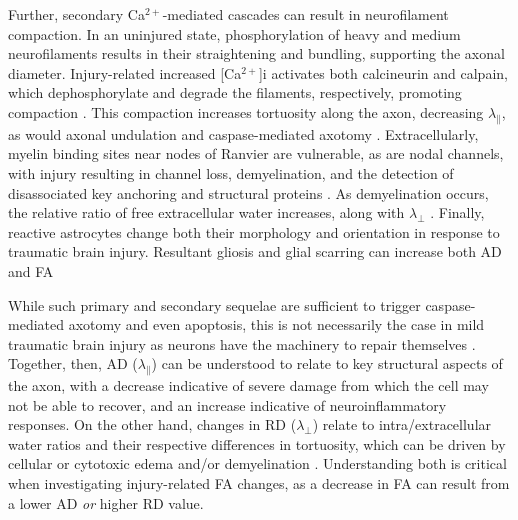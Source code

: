 \documentclass[12pt]{article}
\begin{document}
Further, secondary Ca$^{2+}$-mediated cascades can result in neurofilament compaction. In an uninjured state, phosphorylation of heavy and medium neurofilaments results in their straightening and bundling, supporting the axonal diameter. Injury-related increased [Ca$^{2+}$]i activates both calcineurin and calpain, which dephosphorylate and degrade the filaments, respectively, promoting compaction \parencite{krieg2023IdentifyingPhenotypesDiffuse,pant1988DephosphorylationNeurofilamentProteins,chen1999EvolutionNeurofilamentSubtype}. This compaction increases tortuosity along the axon, decreasing $\lambda_\parallel$, as would axonal undulation and caspase-mediated axotomy \parencite{svandova2023MakingHeadCaspases}. Extracellularly, myelin binding sites near nodes of Ranvier are vulnerable, as are nodal channels, with injury resulting in channel loss, demyelination, and the detection of disassociated key anchoring and structural proteins \parencite{song2022ConcussionLeadsWidespread,zhu2016NodalTotalAxonal,krieg2023IdentifyingPhenotypesDiffuse}. As demyelination occurs, the relative ratio of free extracellular water increases, along with $\lambda_\perp$ \parencite{mayer2010ProspectiveDiffusionTensor,winklewski2018UnderstandingPhysiopathologyAxial}. Finally, reactive astrocytes change both their morphology and orientation in response to traumatic brain injury. Resultant gliosis and glial scarring can increase both AD and FA \parencite{budde2011ContributionGliosisDiffusion,churchill2017WhiteMatterMicrostructure,cieri2025AstrocytesReactiveAstrogliosis,mira2021TraumaticBrainInjury,sofroniew2009MolecularDissectionReactive}

While such primary and secondary sequelae are sufficient to trigger caspase-mediated axotomy and even apoptosis, this is not necessarily the case in mild traumatic brain injury as neurons have the machinery to repair themselves \parencite{franze2013MechanicsNeuronalDevelopment,sakai2019InflammationNeuralRepair}. Together, then, AD ($\lambda_\parallel$) can be understood to relate to key structural aspects of the axon, with a decrease indicative of severe damage from which the cell may not be able to recover, and an increase indicative of neuroinflammatory responses. On the other hand, changes in RD ($\lambda_\perp$) relate to intra/extracellular water ratios and their respective differences in tortuosity, which can be driven by cellular or cytotoxic edema and/or demyelination \parencite{borja2018DiffusionMRImaging,mayer2017SpectrumMildTraumatic,lindsey2023DiffusionWeightedImagingMild}. Understanding both is critical when investigating injury-related FA changes, as a decrease in FA can result from a lower AD \textit{or} higher RD value.
\end{document}
